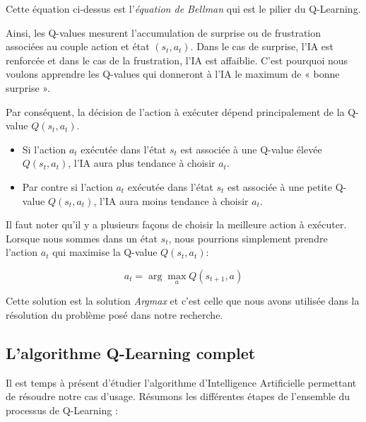 \documentclass{article}
\begin{document}
Cette équation ci-dessus est l'\emph{équation de Bellman} qui est le pilier du Q-Learning.

Ainsi, les Q-values mesurent l'accumulation de surprise ou de frustration associées au couple action et état $(s_t, a_t)$. Dans le cas de surprise, l'IA est renforcée et dans le cas de la frustration, l'IA est affaiblie. C'est pourquoi nous voulons apprendre les Q-values qui donneront à l'IA le maximum de « bonne surprise ».

Par conséquent, la décision de l'action à exécuter dépend principalement de la Q-value $Q(s_t, a_t)$. 
\begin{itemize}
    \item Si l'action $a_t$ exécutée dans l'état $s_t$ est associée à une Q-value élevée $Q(s_t, a_t)$, l'IA aura plus tendance à choisir $a_t$.
    \item Par contre si l'action $a_t$ exécutée dans l'état $s_t$ est associée à une petite Q-value $Q(s_t, a_t)$, l'IA aura moins tendance à choisir $a_t$.
\end{itemize}

Il faut noter qu'il y a plusieurs façons de choisir la meilleure action à exécuter. Lorsque nous sommes dans un état $s_t$, nous pourrions simplement prendre l'action $a_t$ qui maximise la Q-value $Q(s_t, a_t)$:

\[
a_t = \arg\max_a Q(s_{t+1}, a)
\]

Cette solution est la solution \emph{Argmax} et c'est celle que nous avons utilisée dans la résolution du problème posé dans notre recherche.

\subsection{L'algorithme Q-Learning complet}

Il est temps à présent d'étudier l'algorithme d'Intelligence Artificielle permettant de résoudre notre cas d'usage. Résumons les différentes étapes de l'ensemble du processus de Q-Learning :
\end{document}
